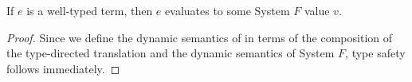 \begin{theorem}
  If $e$ is a well-typed \name term, then $e$ evaluates to some System $F$
  value $v$.
\end{theorem}
\begin{proof}
  Since we define the dynamic semantics of \name in terms of the composition of
  the type-directed translation and the dynamic semantics of System $F$, type safety follows immediately.
\end{proof}
